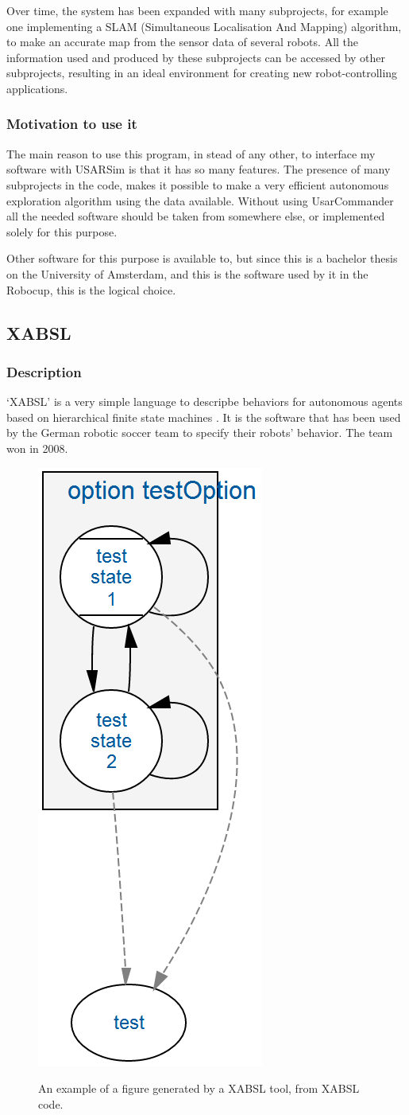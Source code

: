 \documentclass[a4paper,10pt]{article}
\begin{document}
\begin{multicols}{2}
Over time, the system has been expanded with many subprojects, for example one
implementing a SLAM
(Simultaneous Localisation And Mapping) algorithm, to make an accurate map from
the sensor data of several robots.\cite{slamet2006manifoldslam} All the information used and produced by
these subprojects can be accessed by other subprojects, resulting in an ideal
environment for creating new robot-controlling applications.

\subsubsection{Motivation to use it}
The main reason to use this program, in stead of any other, to interface my
software with USARSim is that it has so many features. The presence of many
subprojects in the code, makes it possible to make a very efficient autonomous
exploration algorithm using the data available. Without using UsarCommander all
the needed software should be taken from somewhere else, or implemented solely
for this purpose.

Other software for this purpose is available to, but since this is a bachelor
thesis on the University of Amsterdam, and this is the software used by it in
the Robocup, this is the logical choice.

\subsection{XABSL}
\subsubsection{Description}
`XABSL' is a very simple language to descripbe behaviors for autonomous agents
based on hierarchical finite state machines \cite{loetzsch2003xabsl}. It is the
software that has been used by the German robotic soccer team to specify their
robots' behavior. The team won in 2008.

\begin{figure}
    \centering
        \includegraphics[width=.2\textwidth]{simpleFsm.png}
    \label{fig:simpleFsm}
    \caption{An example of a figure generated by a XABSL tool, from XABSL code.}
\end{figure}


\end{multicols}
\end{document}
